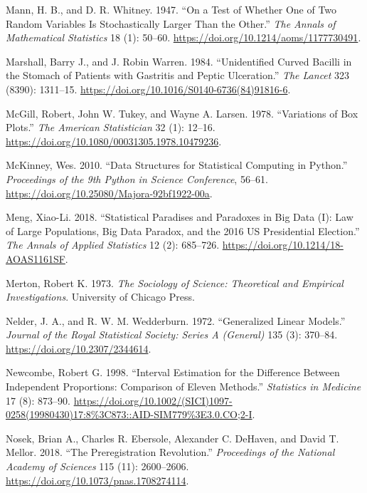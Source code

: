 \documentclass[
]{book}
\newlength{\cslhangindent}
\newenvironment{CSLReferences}[2] %
 {\begin{list}{}{%
  \setlength{\itemindent}{0pt}
  \setlength{\leftmargin}{0pt}
  \setlength{\parsep}{0pt}
  \ifodd #1
   \setlength{\leftmargin}{\cslhangindent}
   \setlength{\itemindent}{-1\cslhangindent}
  \fi
  \setlength{\itemsep}{#2\baselineskip}}}
 {\end{list}}
\begin{document}
\begin{CSLReferences}{1}{1}
Mann, H. B., and D. R. Whitney. 1947. {``On a Test of Whether One of Two Random Variables Is Stochastically Larger Than the Other.''} \emph{The Annals of Mathematical Statistics} 18 (1): 50--60. \url{https://doi.org/10.1214/aoms/1177730491}.

Marshall, Barry J., and J. Robin Warren. 1984. {``Unidentified Curved Bacilli in the Stomach of Patients with Gastritis and Peptic Ulceration.''} \emph{The Lancet} 323 (8390): 1311--15. \url{https://doi.org/10.1016/S0140-6736(84)91816-6}.

McGill, Robert, John W. Tukey, and Wayne A. Larsen. 1978. {``Variations of Box Plots.''} \emph{The American Statistician} 32 (1): 12--16. \url{https://doi.org/10.1080/00031305.1978.10479236}.

McKinney, Wes. 2010. {``Data Structures for Statistical Computing in {Python}.''} \emph{Proceedings of the 9th Python in Science Conference}, 56--61. \url{https://doi.org/10.25080/Majora-92bf1922-00a}.

Meng, Xiao-Li. 2018. {``Statistical Paradises and Paradoxes in Big Data ({I}): Law of Large Populations, Big Data Paradox, and the 2016 {US} Presidential Election.''} \emph{The Annals of Applied Statistics} 12 (2): 685--726. \url{https://doi.org/10.1214/18-AOAS1161SF}.

Merton, Robert K. 1973. \emph{The Sociology of Science: Theoretical and Empirical Investigations}. University of Chicago Press.

Nelder, J. A., and R. W. M. Wedderburn. 1972. {``Generalized Linear Models.''} \emph{Journal of the Royal Statistical Society: Series A (General)} 135 (3): 370--84. \url{https://doi.org/10.2307/2344614}.

Newcombe, Robert G. 1998. {``Interval Estimation for the Difference Between Independent Proportions: Comparison of Eleven Methods.''} \emph{Statistics in Medicine} 17 (8): 873--90. \url{https://doi.org/10.1002/(SICI)1097-0258(19980430)17:8\%3C873::AID-SIM779\%3E3.0.CO;2-I}.

Nosek, Brian A., Charles R. Ebersole, Alexander C. DeHaven, and David T. Mellor. 2018. {``The Preregistration Revolution.''} \emph{Proceedings of the National Academy of Sciences} 115 (11): 2600--2606. \url{https://doi.org/10.1073/pnas.1708274114}.


\end{CSLReferences}
\end{document}
